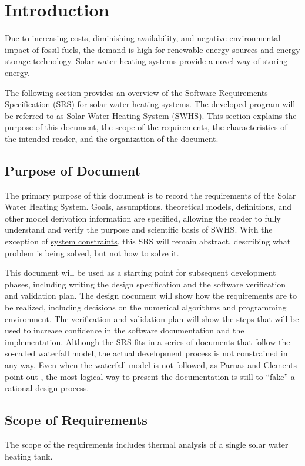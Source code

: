 \documentclass[12pt]{article}
\begin{document}
\section{Introduction}
\label{Sec:Intro}
Due to increasing costs, diminishing availability, and negative environmental impact of fossil fuels, the demand is high for renewable energy sources and energy storage technology. Solar water heating systems provide a novel way of storing energy.

The following section provides an overview of the Software Requirements Specification (SRS) for solar water heating systems. The developed program will be referred to as Solar Water Heating System (SWHS). This section explains the purpose of this document, the scope of the requirements, the characteristics of the intended reader, and the organization of the document.

\subsection{Purpose of Document}
\label{Sec:DocPurpose}
The primary purpose of this document is to record the requirements of the Solar Water Heating System. Goals, assumptions, theoretical models, definitions, and other model derivation information are specified, allowing the reader to fully understand and verify the purpose and scientific basis of SWHS. With the exception of \hyperref[Sec:SysConstraints]{system constraints}, this SRS will remain abstract, describing what problem is being solved, but not how to solve it.

This document will be used as a starting point for subsequent development phases, including writing the design specification and the software verification and validation plan. The design document will show how the requirements are to be realized, including decisions on the numerical algorithms and programming environment. The verification and validation plan will show the steps that will be used to increase confidence in the software documentation and the implementation. Although the SRS fits in a series of documents that follow the so-called waterfall model, the actual development process is not constrained in any way. Even when the waterfall model is not followed, as Parnas and Clements point out \cite{parnasClements1986}, the most logical way to present the documentation is still to ``fake'' a rational design process.

\subsection{Scope of Requirements}
\label{Sec:ReqsScope}
The scope of the requirements includes thermal analysis of a single solar water heating tank.
\end{document}
